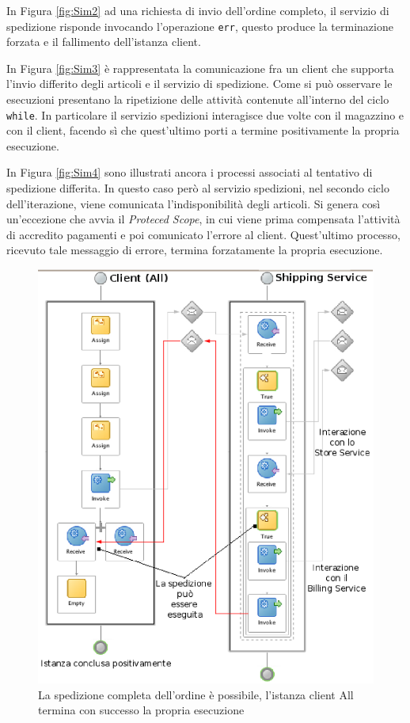 In Figura \ref{fig:Sim2} ad una richiesta di invio dell'ordine completo, il
servizio di spedizione risponde invocando l'operazione \texttt{err}, questo
produce la terminazione forzata e il fallimento dell'istanza client.

In Figura \ref{fig:Sim3} è rappresentata la comunicazione fra un client che
supporta l'invio differito degli articoli e il servizio di spedizione. Come si
può osservare le esecuzioni presentano la ripetizione delle attività contenute
all'interno del ciclo \texttt{while}. In particolare il servizio spedizioni
interagisce due volte con il magazzino e con il client, facendo sì che
quest'ultimo porti a termine positivamente la propria esecuzione.

In Figura \ref{fig:Sim4} sono illustrati ancora i processi associati al
tentativo di spedizione differita. In questo caso però al servizio spedizioni,
nel secondo ciclo dell'iterazione, viene comunicata l'indisponibilità degli
articoli. Si genera così un'eccezione che avvia il
\emph{Proteced Scope}, in cui viene prima compensata l'attività di accredito
pagamenti e poi comunicato l'errore al client. Quest'ultimo processo, ricevuto
tale messaggio di errore, termina forzatamente la propria esecuzione. 

\begin{figure}[p]
\begin{center}
  \includegraphics[scale=0.85,clip]{blide/dia/Sim1}
   \caption[Blide, simulazione 1]{La spedizione completa dell'ordine è
   possibile, l'istanza client All termina con successo la propria esecuzione}
  \label{fig:Sim1}
\end{center}
\end{figure}

